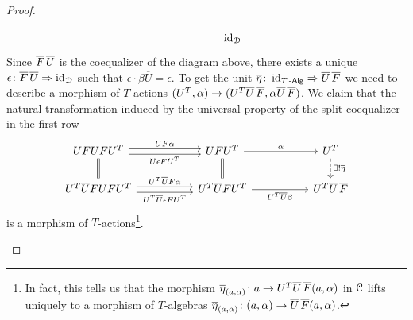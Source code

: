\documentclass[a4paper,11pt,oneside,openany]{scrbook}
\begin{document}
\begin{proof}
\begin{enumerate}
\[\begin{tikzcd}
				      && \id_{\D}
			      \end{tikzcd}
		      \]
		      Since $\overline{F}\hspace{.5mm}\overline{U}$ is the coequalizer of the diagram above, there exists a unique $\overline{\epsilon}\colon\overline{F}\hspace{.5mm}\overline{U}\Rightarrow\operatorname{id}_{\operatorname{\mathcal{D}}}$ such that $\overline{\epsilon}\cdot\beta\overline{U}=\epsilon$. To get the unit $\overline{\eta}\colon\operatorname{id}_{T\operatorname{-\mathsf{Alg}}}\Rightarrow\overline{U}\hspace{.5mm}\overline{F}$ we need to describe a morphism of $T$-actions $(U^T,\alpha)\to(U^T\overline{U}\hspace{.5mm}\overline{F},\alpha\overline{U}\hspace{.5mm}\overline{F})$. We claim that the natural transformation induced by the universal property of the split coequalizer in the first row
		      \[
			      \begin{tikzcd}[column sep=1.8cm]
				      UFUFU^T\arrow[r, shift left, "UF\alpha"] \arrow[r, shift right, "U\epsilon FU^T"']\arrow[d, equal]	& UFU^T\arrow[r, "\alpha"] \arrow[d, equal] & U^T \arrow[d, dashed, "\exists!\overline{\eta}"]\\
				      U^T\overline{U}FUFU^T\arrow[r, shift left,  "U^T\overline{U}F\alpha"] \arrow[r, shift right, "U^T\overline{U}\epsilon FU^T"']&U^T\overline{U}FU^T\arrow[r, "U^T\overline{U}\beta"']& U^T\overline{U}\hspace{.5mm}\overline{F}
			      \end{tikzcd}
		      \]
		      is a morphism of $T$-actions\footnote{In fact, this tells us that
              the morphism $\overline{\eta}_{(a,\alpha)}\colon a\to
              U^T\overline{U}\hspace{.5mm}\overline{F}(a,\alpha)$ in $\operatorname{\mathcal{C}}$ lifts
              uniquely to a morphism of $T$-algebras
              $\overline{\eta}_{(a,\alpha)}\colon(a,\alpha)\to\overline{U}\hspace{.5mm}\overline{F}(a,\alpha)$.}.


\end{enumerate}
\end{proof}
\end{document}
